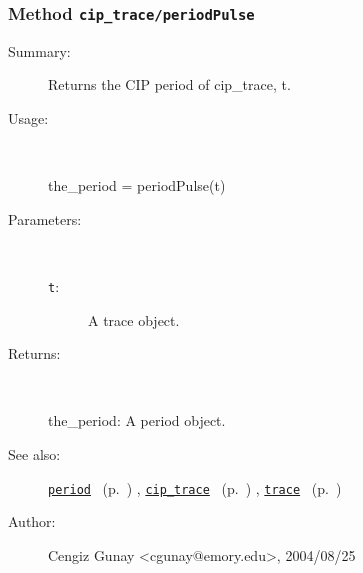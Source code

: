 \subsubsection[Method \texttt{periodPulse}]{Method \texttt{cip\_trace/periodPulse}}%
%
\label{ref_cip_trace__periodPulse}%
\hypertarget{ref_cip_trace__periodPulse}{}%
\begin{description}
\item[Summary:]Returns the CIP period of cip\_trace, t. 
%
\item[Usage:]~%
\begin{lyxcode}%
the\_period = periodPulse(t)
%
\end{lyxcode}%
%
%
\item[Parameters:]~
\begin{description}%
\item[\texttt{t}:]
 A trace object.
\end{description}%
%
\item[Returns:]~

	the\_period: A period object.
%
%
\item[See also:]%
\hyperlink{ref_period}{\texttt{period}}%
\ (p.~\pageref{ref_period})%
%
, \hyperlink{ref_cip_trace}{\texttt{cip\_trace}}%
\ (p.~\pageref{ref_cip_trace})%
%
, \hyperlink{ref_trace}{\texttt{trace}}%
\ (p.~\pageref{ref_trace})%
%
%
\item[Author:]%
Cengiz Gunay <cgunay@emory.edu>, 2004/08/25%
\end{description}
\methodline%
